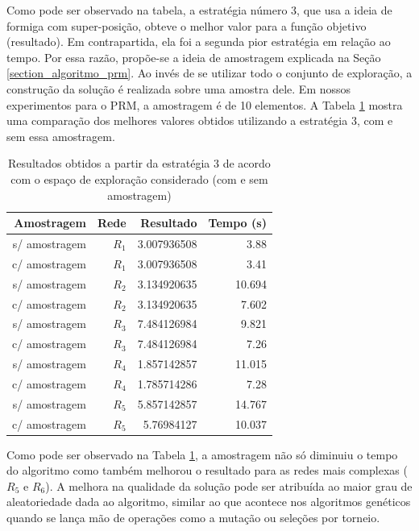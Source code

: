 Como pode ser observado na tabela, a estratégia número 3, que usa a ideia de formiga com super-posição, obteve o melhor valor para a função objetivo (resultado). Em contrapartida, ela foi a segunda pior estratégia em relação ao tempo. Por essa razão, propõe-se a ideia de amostragem explicada na Seção \ref{section_algoritmo_prm}. Ao invés de se utilizar todo o conjunto de exploração, a construção da solução é realizada sobre uma amostra dele. Em nossos experimentos para o PRM, a amostragem é de 10 elementos. A Tabela \ref{tab_exp2_amostragem} mostra uma comparação dos melhores valores obtidos utilizando a estratégia 3, com e sem essa amostragem.

\begin{table}[!htbp]
	\centering
	\caption{Resultados obtidos a partir da estratégia 3 de acordo com o espaço de exploração considerado (com e sem amostragem)}
	\label{tab_exp2_amostragem}
	\begin{tabular}{rrrr}
		Amostragem    & Rede & Resultado   & Tempo (s) \\ \hline
		s/ amostragem & $R_1$    & 3.007936508 & 3.88      \\
		\rowcolor{table-green}
		c/ amostragem & $R_1$    & 3.007936508 & 3.41      \\ \hline
		s/ amostragem & $R_2$    & 3.134920635 & 10.694    \\
		\rowcolor{table-green}
		c/ amostragem & $R_2$    & 3.134920635 & 7.602     \\ \hline
		s/ amostragem & $R_3$    & 7.484126984 & 9.821     \\
		\rowcolor{table-green}
		c/ amostragem & $R_3$    & 7.484126984 & 7.26      \\ \hline
		s/ amostragem & $R_4$    & 1.857142857 & 11.015    \\
		\rowcolor{table-green}
		c/ amostragem & $R_4$    & 1.785714286 & 7.28      \\ \hline
		s/ amostragem & $R_5$    & 5.857142857 & 14.767    \\
		\rowcolor{table-green}
		c/ amostragem & $R_5$    & 5.76984127  & 10.037    \\ \hline
	\end{tabular}
\end{table}

Como pode ser observado na Tabela \ref{tab_exp2_amostragem}, a amostragem não só diminuiu o tempo do algoritmo como também melhorou o resultado para as redes mais complexas ($R_5$ e $R_6$). A melhora na qualidade da solução pode ser atribuída ao maior grau de aleatoriedade dada ao algoritmo, similar ao que acontece nos algoritmos genéticos quando se lança mão de operações como a mutação ou seleções por torneio.

